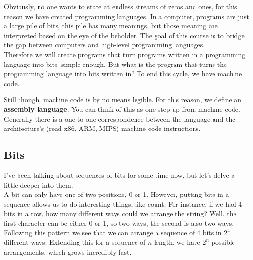 \documentclass[12pt, twoside]{article}
\begin{document}

Obviously, no one wants to stare at endless streams of zeros and ones, for this reason we have created programming languages.  In a computer, programs are just a large pile of bits, this pile has many meanings, but those meaning are interpreted based on the eye of the beholder.  The goal of this course is to bridge the gap between computers and high-level programming languages. \\

Therefore we will create programs that turn programs written in a programming language into bits, simple enough.  But what is the program that turns the programming language into bits written in?  To end this cycle, we have machine code. \\


Still though, machine code is by no means legible.  For this reason, we define an \textbf{assembly language}.  You can think of this as one step up from machine code.  Generally there is a one-to-one correspondence between the language and the architecture's (read x86, ARM, MIPS) machine code instructions.

\subsection{Bits}

I've been talking about sequences of bits for some time now, but let's delve a little deeper into them. \\

A bit can only have one of two positions, 0 or 1.  However, putting bits in a sequence allows us to do interesting things, like count.  For instance, if we had 4 bits in a row, how many different ways could we arrange the string?  Well, the first character can be either 0 or 1, so two ways, the second is also two ways.  Following this pattern we see that we can arrange a sequence of 4 bits in $2^4$ different ways.  Extending this for a sequence of $n$ length, we have $2^n$ possible arrangements, which grows incredibly fast. \\
\end{document}
